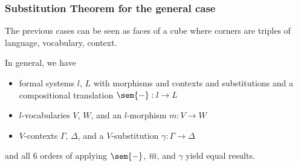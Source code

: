 \begin{frame}\frametitle{Substitution Theorem for the general case}
The previous cases can be seen as faces of a cube where corners are triples of language, vocabulary, context.

In general, we have
\begin{itemize}
\item formal systems $l$, $L$ with morphisms and contexts and substitutions and a compositional translation $\sem{-}:l\to L$
\item $l$-vocabularies $V$, $W$, and an $l$-morphism $m:V\to W$
\item $V$-contexts $\Gamma$, $\Delta$, and a $V$-substitution $\gamma:\Gamma\to\Delta$
\end{itemize}
and all $6$ orders of applying $\sem{-}$, $\overline{m}$, and $\gamma$ yield equal results.
\end{frame}



%

